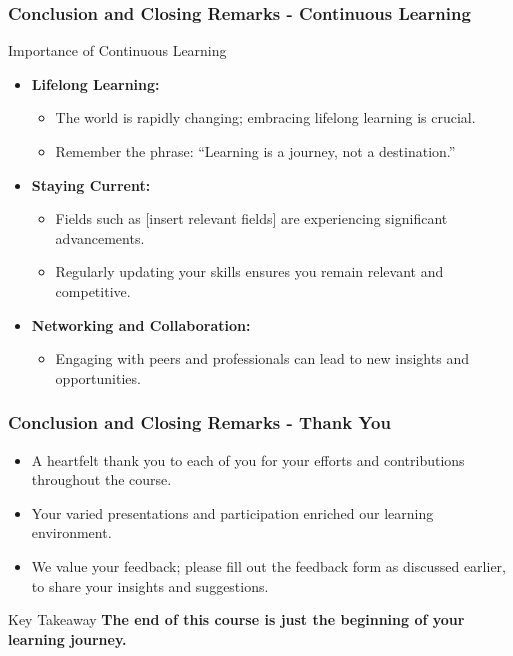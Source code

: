 \documentclass[aspectratio=169]{beamer}
\begin{document}
\begin{frame}[fragile]
  \frametitle{Conclusion and Closing Remarks - Continuous Learning}

  \begin{block}{Importance of Continuous Learning}
    \begin{itemize}
      \item \textbf{Lifelong Learning:}
        \begin{itemize}
          \item The world is rapidly changing; embracing lifelong learning is crucial.
          \item Remember the phrase: ``Learning is a journey, not a destination.''
        \end{itemize}

      \item \textbf{Staying Current:}
        \begin{itemize}
          \item Fields such as [insert relevant fields] are experiencing significant advancements.
          \item Regularly updating your skills ensures you remain relevant and competitive.
        \end{itemize}

      \item \textbf{Networking and Collaboration:}
        \begin{itemize}
          \item Engaging with peers and professionals can lead to new insights and opportunities.
        \end{itemize}
    \end{itemize}
  \end{block}
\end{frame}

\begin{frame}[fragile]
  \frametitle{Conclusion and Closing Remarks - Thank You}

  \begin{itemize}
    \item A heartfelt thank you to each of you for your efforts and contributions throughout the course. 
    \item Your varied presentations and participation enriched our learning environment.
    \item We value your feedback; please fill out the feedback form as discussed earlier, to share your insights and suggestions.
  \end{itemize}

  \begin{block}{Key Takeaway}
    \textbf{The end of this course is just the beginning of your learning journey.}
  \end{block}
\end{frame}
\end{document}
